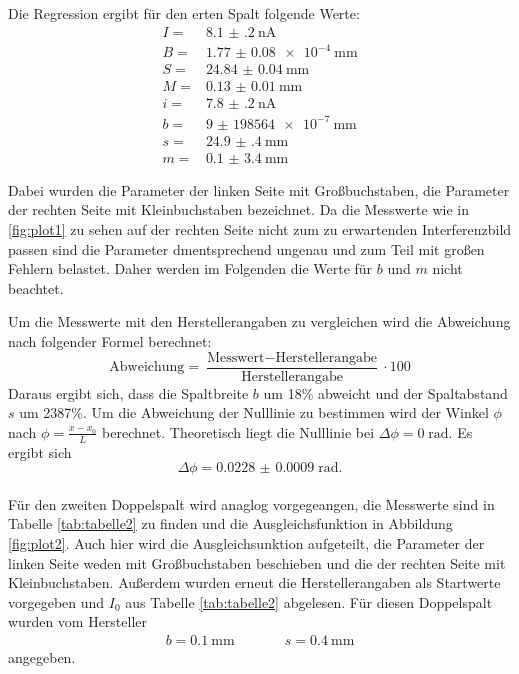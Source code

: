 Die Regression ergibt für den erten Spalt folgende Werte:
\begin{align*}
  I =& \SI{8.1(2)}{\nA}\\
  B =& \SI{1.77(8)e-4}{\mm}\\
  S =& \SI{24.84(4)}{\mm}\\
  M =& \SI{0.13(1)}{\mm}\\
  i =& \SI{7.8(2)}{\nA}\\
  b =& \SI{9(198564)e-7}{\mm}\\
  s =& \SI{24.9(4)}{\mm}\\
  m =& \SI{0.1(34)}{\mm}
\end{align*}

Dabei wurden die Parameter der linken Seite mit Großbuchstaben, die Parameter der rechten Seite
mit Kleinbuchstaben bezeichnet. Da die Messwerte wie in \ref{fig:plot1} zu sehen auf der rechten
Seite nicht zum zu erwartenden Interferenzbild passen sind die Parameter dmentsprechend ungenau und
zum Teil mit großen Fehlern belastet. Daher werden im Folgenden die Werte für
$b$ und $m$ nicht beachtet.

Um die Messwerte mit den Herstellerangaben zu vergleichen wird die Abweichung nach folgender
Formel berechnet:
\begin{equation}
  \text{Abweichung}=\frac{\text{Messwert}-\text{Herstellerangabe}}{\text{Herstellerangabe}}\cdot100
\end{equation}
Daraus ergibt sich, dass die Spaltbreite $b$ um 18\% abweicht
und der Spaltabstand $s$ um 2387\%.
Um die Abweichung der Nulllinie zu bestimmen wird
der Winkel $\phi$ nach $\phi=\frac{x-x_{0}}{L}$ berechnet. Theoretisch liegt die
Nulllinie bei $\Delta \phi=0\;\text{rad} $. Es ergibt sich
\begin{equation*}
  \Delta \phi =\SI{0.0228(9)}\; \text{rad}.
\end{equation*}\\

Für den zweiten Doppelspalt wird anaglog vorgegeangen, die Messwerte sind in Tabelle
\ref{tab:tabelle2} zu finden und die Ausgleichsfunktion in Abbildung \ref{fig:plot2}.
Auch hier wird die Ausgleichsunktion aufgeteilt, die Parameter der linken Seite weden mit
Großbuchstaben beschieben und die der rechten Seite mit Kleinbuchstaben. Außerdem wurden erneut die Herstellerangaben
als Startwerte vorgegeben und $I_0$ aus Tabelle \ref{tab:tabelle2} abgelesen.
Für diesen Doppelspalt wurden vom Hersteller
\begin{align*}
  b=\SI{0,1}{\mm}  &\;\;\;\;\;\;\;\;\;\; s=\SI{0,4}{\mm}
\end{align*}
angegeben.

